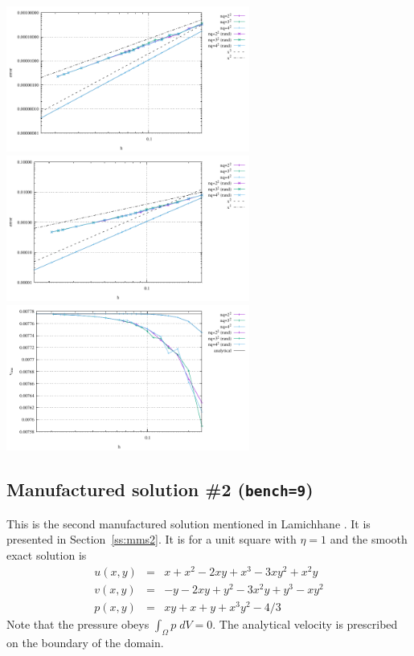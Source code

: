 \begin{center}
\includegraphics[width=8cm]{python_codes/fieldstone_76/results/mms1/errors_v}
\includegraphics[width=8cm]{python_codes/fieldstone_76/results/mms1/errors_p}\\
\includegraphics[width=8cm]{python_codes/fieldstone_76/results/mms1/vrms}
\end{center}

\subsection*{Manufactured solution \#2 ({\tt bench=9})}

This is the second manufactured solution 
mentioned in Lamichhane \cite{lami17}. It is presented in Section~\ref{ss:mms2}.
It is for a unit square with $\eta=1$ and the smooth exact solution is
\begin{eqnarray}
u(x,y) &=& x+x^2 - 2xy+x^3 - 3xy^2 + x^2y \\
v(x,y) &=& -y-2xy+y^2 -3x^2y + y^3 - xy^2 \\
p(x,y) &=& xy+x+y+x^3y^2 - 4/3
\end{eqnarray}
Note that the pressure obeys $\int_{\Omega} p \; dV = 0$. The analytical 
velocity is prescribed on the boundary of the domain. 


